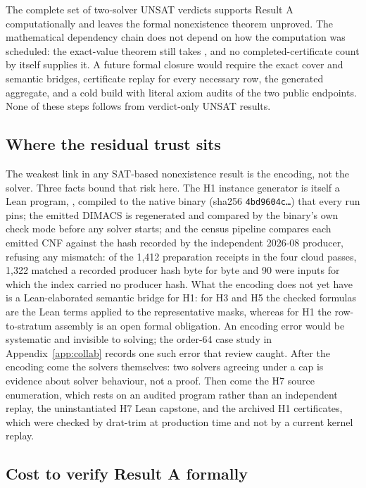 \documentclass{anvil-paper}
\newcommand{\hnoFortyNine}{\lean{hno49}}
\theoremstyle{definition}
\begin{document}
The complete set of two-solver UNSAT verdicts supports Result A computationally and leaves the formal nonexistence theorem unproved. The mathematical dependency chain does not depend on how the computation was scheduled: the exact-value theorem still takes \hnoFortyNine, and no completed-certificate count by itself supplies it. A future formal closure would require the exact cover and semantic bridges, certificate replay for every necessary row, the generated aggregate, and a cold build with literal axiom audits of the two public endpoints. None of these steps follows from verdict-only UNSAT results.

\subsection{Where the residual trust sits}\label{sec:trust}

The weakest link in any SAT-based nonexistence result is the encoding, not the solver. Three facts bound that risk here. The H1 instance generator is itself a Lean program, , compiled to the native  binary (sha256 \texttt{4bd9604c\ldots}) that every run pins; the emitted DIMACS is regenerated and compared by the binary's own check mode before any solver starts; and the census pipeline compares each emitted CNF against the hash recorded by the independent 2026-08 producer, refusing any mismatch: of the 1,412 preparation receipts in the four cloud passes, 1,322 matched a recorded producer hash byte for byte and 90 were inputs for which the index carried no producer hash. What the encoding does not yet have is a Lean-elaborated semantic bridge for H1: for H3 and H5 the checked formulas are the Lean terms  applied to the representative masks, whereas for H1 the row-to-stratum assembly is an open formal obligation. An encoding error would be systematic and invisible to solving; the order-64 case study in Appendix~\ref{app:collab} records one such error that review caught. After the encoding come the solvers themselves: two solvers agreeing under a cap is evidence about solver behaviour, not a proof. Then come the H7 source enumeration, which rests on an audited program rather than an independent replay, the uninstantiated H7 Lean capstone, and the archived H1 certificates, which were checked by drat-trim at production time and not by a current kernel replay.

\subsection{Cost to verify Result A formally}\label{sec:cost}
\end{document}

